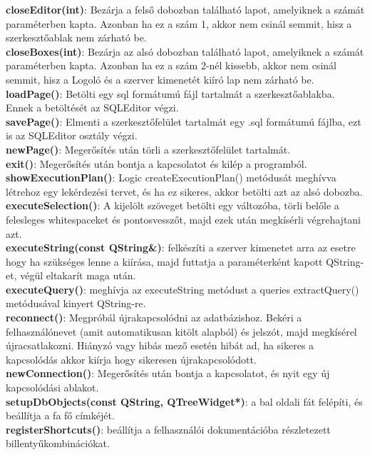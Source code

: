 \textbf{closeEditor(int)}: Bezárja a felső dobozban található lapot, amelyiknek a számát paraméterben kapta. Azonban ha ez a szám 1, akkor nem csinál semmit, hisz a szerkesztőablak nem zárható be. \\
\textbf{closeBoxes(int)}: Bezárja az alsó dobozban található lapot, amelyiknek a számát paraméterben kapta. Azonban ha ez a szám 2-nél kissebb, akkor nem csinál semmit, hisz a Logoló és a szerver kimenetét kiíró lap nem zárható be. \\
\textbf{loadPage()}: Betölti egy sql formátumú fájl tartalmát a szerkesztőablakba. Ennek a betöltését az SQLEditor végzi. \\
\textbf{savePage()}: Elmenti a szerkesztőfelület tartalmát egy .sql formátumú fájlba, ezt is az SQLEditor osztály végzi. \\
\textbf{newPage()}: Megerősítés után törli a szerkesztőfelület tartalmát. \\
\textbf{exit()}: Megerősítés után bontja a kapcsolatot és kilép a programból. \\
\textbf{showExecutionPlan()}: Logic createExecutionPlan() metódusát meghívva létrehoz egy lekérdezési tervet, és ha ez sikeres, akkor betölti azt az alsó dobozba. \\
\textbf{executeSelection()}: A kijelölt szöveget betölti egy változóba, törli belőle a felesleges whitespaceket és pontosvesszőt, majd ezek után megkísérli végrehajtani azt. \\
\textbf{executeString(const QString\&)}: felkészíti a szerver kimenetet arra az esetre hogy ha szükséges lenne a kiírása, majd futtatja a paraméterként kapott QString-et, végül eltakarít maga után. \\
\textbf{executeQuery()}: meghívja az executeString metódust a queries extractQuery() metódusával kinyert QString-re. \\
\textbf{reconnect()}: Megpróbál újrakapcsolódni az adatbázishoz. Bekéri a felhasználónevet (amit automatikusan kitölt alapból) és jelszót, majd megkísérel újracsatlakozni. Hiányzó vagy hibás mező esetén hibát ad, ha sikeres a kapcsolódás akkor kiírja hogy sikeresen újrakapcsolódott. \\
\textbf{newConnection()}: Megerősítés után bontja a kapcsolatot, és nyit egy új kapcsolódási ablakot. \\
\textbf{setupDbObjects(const QString, QTreeWidget*)}: a bal oldali fát felépíti, és beállítja a fa fő címkéjét. \\
\textbf{registerShortcuts()}: beállítja a felhasználói dokumentációba részletezett billentyűkombinációkat. \\
